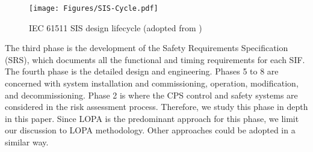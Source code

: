 \documentclass[journal]{IEEEtran}
\begin{document}
\begin{figure*}[]
\centering
		

\texttt{[image: Figures/SIS-Cycle.pdf]}
	\caption{IEC 61511 SIS design lifecycle (adopted from \cite{IEC61511})}
\label{fig:SIS-cycle}
\end{figure*}

The third phase is the development of the Safety Requirements Specification (SRS), which documents all the functional and timing requirements for each SIF. The fourth phase is the detailed design and engineering. Phases 5 to 8 are concerned with system installation and commissioning, operation, modification, and decommissioning. Phase 2 is where the CPS control and safety systems are considered in the risk assessment process. Therefore, we study this phase in depth in this paper. Since LOPA is the predominant approach for this phase, we limit our discussion to LOPA methodology. Other approaches could be adopted in a similar way.
\end{document}
